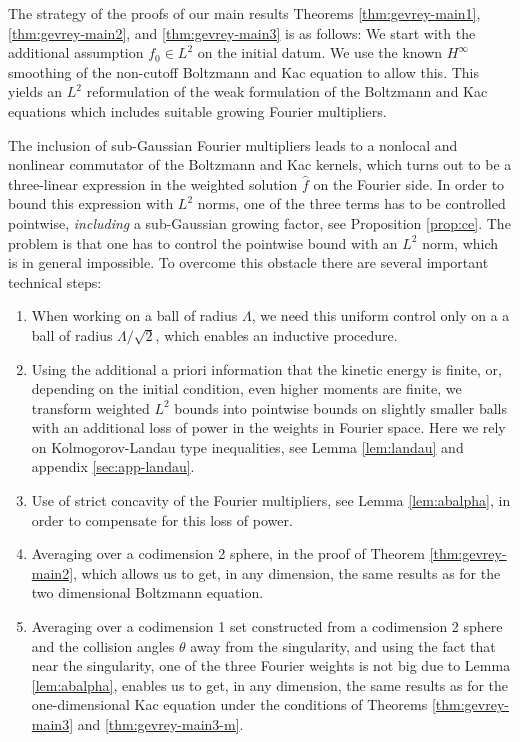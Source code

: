 \documentclass[11pt,a4paper,reqno]{amsart}
\theoremstyle{plain}
\theoremstyle{definition}
\begin{document}
The strategy of the proofs of our main results Theorems \ref{thm:gevrey-main1}, \ref{thm:gevrey-main2}, and \ref{thm:gevrey-main3} is as follows:
We start with the additional assumption $f_0\in L^2$ on the initial datum. We use the
known $H^\infty$ smoothing of the non-cutoff Boltzmann and Kac equation to allow this.
This yields an $L^2$ reformulation of the weak formulation of the Boltzmann and Kac equations which includes suitable growing Fourier multipliers.

The inclusion of sub-Gaussian Fourier multipliers leads to a nonlocal and nonlinear commutator of the Boltzmann and Kac kernels, which turns out to be a three-linear expression in the weighted solution $\hat{f}$ on the Fourier side. In order to bound this expression with $L^2$ norms, one of the three terms has to be controlled pointwise, \emph{including} a sub-Gaussian growing factor, see Proposition \ref{prop:ce}. The problem is that one has to control the pointwise bound with an $L^2$ norm, which is in general impossible. To overcome this obstacle there are several important technical steps:
\begin{enumerate}[label=(\arabic*)]
	\item When working on a ball of radius $\Lambda$, we need this uniform control only on a a ball of radius $\Lambda/\sqrt{2}$, which enables an inductive procedure.
	\item Using the additional a priori information that the kinetic energy is finite, or, depending on the initial condition, even higher moments are finite, we transform weighted $L^2$ bounds into pointwise bounds on slightly smaller balls with an additional loss of power in the weights in Fourier space. Here we rely on
	    Kolmogorov-Landau type inequalities, see Lemma \ref{lem:landau} and appendix \ref{sec:app-landau}.
	\item Use of strict concavity of the Fourier multipliers, see Lemma \ref{lem:abalpha}, in order to compensate for this loss of power.
	\item Averaging over a codimension 2 sphere, in the proof of Theorem \ref{thm:gevrey-main2}, which allows us to get, in any dimension, the same results as for the two dimensional Boltzmann equation.
	\item Averaging over a codimension 1  set constructed from a codimension 2 sphere and the collision angles $\theta$ away from the singularity, and using the fact that near the singularity, one of the three Fourier weights is not big due to Lemma \ref{lem:abalpha}, enables us to get,  in any dimension, the same results as for the one-dimensional Kac equation under the conditions of Theorems \ref{thm:gevrey-main3} and \ref{thm:gevrey-main3-m}.
\end{enumerate}
\end{document}

